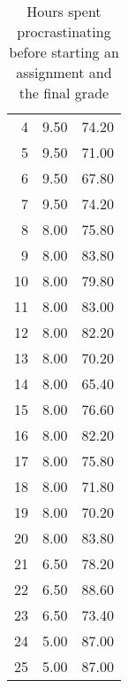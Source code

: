 \documentclass[11pt]{exam}
\begin{document}
\begin{questions}
\begin{table}[ht]
\begin{center}
\begin{tabular}{rrr}
  4 & 9.50 & 74.20 \\ 
  5 & 9.50 & 71.00 \\ 
  6 & 9.50 & 67.80 \\ 
  7 & 9.50 & 74.20 \\ 
  8 & 8.00 & 75.80 \\ 
  9 & 8.00 & 83.80 \\ 
  10 & 8.00 & 79.80 \\ 
  11 & 8.00 & 83.00 \\ 
  12 & 8.00 & 82.20 \\ 
  13 & 8.00 & 70.20 \\ 
  14 & 8.00 & 65.40 \\ 
  15 & 8.00 & 76.60 \\ 
  16 & 8.00 & 82.20 \\ 
  17 & 8.00 & 75.80 \\ 
  18 & 8.00 & 71.80 \\ 
  19 & 8.00 & 70.20 \\ 
  20 & 8.00 & 83.80 \\ 
  21 & 6.50 & 78.20 \\ 
  22 & 6.50 & 88.60 \\ 
  23 & 6.50 & 73.40 \\ 
  24 & 5.00 & 87.00 \\ 
  25 & 5.00 & 87.00 \\ 
   \hline
\end{tabular}
\caption{Hours spent procrastinating before starting an assignment and the final grade}
\label{tab:procrast}
\end{center}
\end{table}%

\end{questions}

\ifprintanswers
\begin{center} \gradetable[v][questions] \end{center}
\fi
\end{document}
